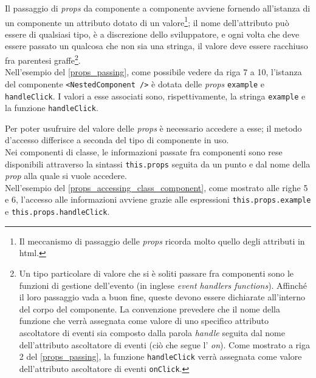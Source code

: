 Il passaggio di \textit{props} da componente a componente avviene fornendo all'istanza di un componente un attributo dotato di un valore\footnote{Il meccanismo di passaggio delle \textit{props} ricorda molto quello degli attributi in \gls{html}.}; il nome dell'attributo può essere di qualsiasi tipo, è a discrezione dello sviluppatore, e ogni volta che deve essere passato un qualcosa che non sia una stringa, il valore deve essere racchiuso fra parentesi graffe\footnote{Un tipo particolare di valore che si è soliti passare fra componenti sono le funzioni di gestione dell'evento (in inglese \textit{event handlers functions}). Affinché il loro passaggio vada a buon fine, queste devono essere dichiarate all'interno del corpo del componente. La convenzione prevedere che il nome della funzione che verrà assegnata come valore di uno specifico attributo ascoltatore di eventi sia composto dalla parola \textit{handle} seguita dal nome dell'attributo ascoltatore di eventi (ciò che segue l' \textit{on}). Come mostrato a riga 2 del \autoref{props_passing}, la funzione \texttt{handleClick} verrà assegnata come valore dell'attributo ascoltatore di eventi \texttt{onClick}.}.\\
Nell'esempio del \autoref{props_passing}, come possibile vedere da riga 7 a 10, l'istanza del componente \texttt{<NestedComponent />} è dotata delle \textit{props} \texttt{example} e \texttt{handleClick}. I valori a esse associati sono, rispettivamente, la stringa \texttt{example} e la funzione \texttt{handleClick}.



Per poter usufruire del valore delle \textit{props} è necessario accedere a esse; il metodo d'accesso differisce a seconda del tipo di componente in uso.\\
Nei componenti di classe, le informazioni passate fra componenti sono rese disponibili attraverso la sintassi \texttt{this.props} seguita da un punto e dal nome della \textit{prop} alla quale si vuole accedere.\\
Nell'esempio del \autoref{props_accessing_class_component},  come mostrato alle righe 5 e 6, l'accesso alle informazioni avviene grazie alle espressioni \texttt{this.props.example} e \texttt{this.props.handleClick}.



